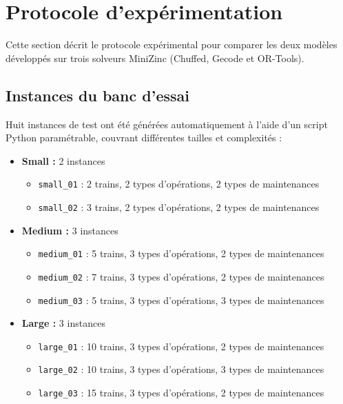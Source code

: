 \section{Protocole d'expérimentation}
\label{sec:protocole}

Cette section décrit le protocole expérimental pour comparer les deux modèles développés sur trois solveurs MiniZinc (Chuffed, Gecode et OR-Tools).

\subsection{Instances du banc d'essai}

Huit instances de test ont été générées automatiquement à l'aide d'un script Python paramétrable, couvrant différentes tailles et complexités :

\begin{itemize}
	\item \textbf{Small :} 2 instances
	      \begin{itemize}
		      \item \texttt{small\_01} : 2 trains, 2 types d'opérations, 2 types de maintenances
		      \item \texttt{small\_02} : 3 trains, 2 types d'opérations, 2 types de maintenances
	      \end{itemize}

	\item \textbf{Medium :} 3 instances
	      \begin{itemize}
		      \item \texttt{medium\_01} : 5 trains, 3 types d'opérations, 2 types de maintenances
		      \item \texttt{medium\_02} : 7 trains, 3 types d'opérations, 2 types de maintenances
		      \item \texttt{medium\_03} : 5 trains, 3 types d'opérations, 3 types de maintenances
	      \end{itemize}

	\item \textbf{Large :} 3 instances
	      \begin{itemize}
		      \item \texttt{large\_01} : 10 trains, 3 types d'opérations, 2 types de maintenances
		      \item \texttt{large\_02} : 10 trains, 3 types d'opérations, 3 types de maintenances
		      \item \texttt{large\_03} : 15 trains, 3 types d'opérations, 2 types de maintenances
	      \end{itemize}
\end{itemize}

